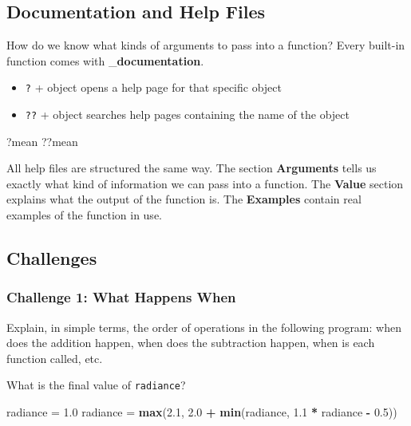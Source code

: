 \documentclass[]{book}
\newenvironment{Shaded}{\begin{snugshade}}{\end{snugshade}}
\newcommand{\KeywordTok}[1]{\textcolor[rgb]{0.13,0.29,0.53}{\textbf{#1}}}
\newcommand{\FloatTok}[1]{\textcolor[rgb]{0.00,0.00,0.81}{#1}}
\newcommand{\StringTok}[1]{\textcolor[rgb]{0.31,0.60,0.02}{#1}}
\newcommand{\OperatorTok}[1]{\textcolor[rgb]{0.81,0.36,0.00}{\textbf{#1}}}
\newcommand{\NormalTok}[1]{#1}
\providecommand{\tightlist}{%
  \setlength{\itemsep}{0pt}\setlength{\parskip}{0pt}}
\begin{document}
\subsection{Documentation and Help
Files}\label{documentation-and-help-files}

How do we know what kinds of arguments to pass into a function? Every
built-in function comes with \_\textbf{documentation}.

\begin{itemize}
\tightlist
\item
  \texttt{?} + object opens a help page for that specific object
\item
  \texttt{??} + object searches help pages containing the name of the
  object
\end{itemize}

\begin{Shaded}
\begin{Highlighting}[]
\NormalTok{?mean}
\NormalTok{??mean}
\end{Highlighting}
\end{Shaded}

All help files are structured the same way. The section
\textbf{Arguments} tells us exactly what kind of information we can pass
into a function. The \textbf{Value} section explains what the output of
the function is. The \textbf{Examples} contain real examples of the
function in use.

\subsection{Challenges}\label{challenges-3}

\subsubsection*{Challenge 1: What Happens
When}\label{challenge-1-what-happens-when}

Explain, in simple terms, the order of operations in the following
program: when does the addition happen, when does the subtraction
happen, when is each function called, etc.

What is the final value of \texttt{radiance}?

\begin{Shaded}
\begin{Highlighting}[]
\NormalTok{radiance =}\StringTok{ }\FloatTok{1.0}
\NormalTok{radiance =}\StringTok{ }\KeywordTok{max}\NormalTok{(}\FloatTok{2.1}\NormalTok{, }\FloatTok{2.0} \OperatorTok{+}\StringTok{ }\KeywordTok{min}\NormalTok{(radiance, }\FloatTok{1.1} \OperatorTok{*}\StringTok{ }\NormalTok{radiance }\OperatorTok{-}\StringTok{ }\FloatTok{0.5}\NormalTok{))}
\end{Highlighting}
\end{Shaded}
\end{document}
